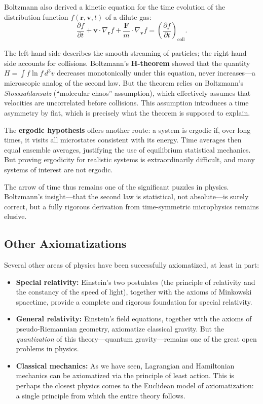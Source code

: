 Boltzmann also derived a kinetic equation for the time evolution of the distribution function $f(\mathbf{r}, \mathbf{v}, t)$ of a dilute gas:
\[
\frac{\partial f}{\partial t} + \mathbf{v} \cdot \nabla_{\mathbf{r}} f + \frac{\mathbf{F}}{m} \cdot \nabla_{\mathbf{v}} f = \left( \frac{\partial f}{\partial t} \right)_{\text{coll}}.
\]

The left-hand side describes the smooth streaming of particles; the right-hand side accounts for collisions. Boltzmann's \textbf{H-theorem} showed that the quantity $H = \int f \ln f \, d^3v$ decreases monotonically under this equation, never increases---a microscopic analog of the second law. But the theorem relies on Boltzmann's \emph{Stosszahlansatz} (``molecular chaos'' assumption), which effectively assumes that velocities are uncorrelated before collisions. This assumption introduces a time asymmetry by fiat, which is precisely what the theorem is supposed to explain.

The \textbf{ergodic hypothesis} offers another route: a system is ergodic if, over long times, it visits all microstates consistent with its energy. Time averages then equal ensemble averages, justifying the use of equilibrium statistical mechanics. But proving ergodicity for realistic systems is extraordinarily difficult, and many systems of interest are not ergodic.

The arrow of time thus remains one of the significant puzzles in physics. Boltzmann's insight---that the second law is statistical, not absolute---is surely correct, but a fully rigorous derivation from time-symmetric microphysics remains elusive.

\subsection{Other Axiomatizations}

Several other areas of physics have been successfully axiomatized, at least in part:

\begin{itemize}
    \item \textbf{Special relativity:} Einstein's two postulates (the principle of relativity and the constancy of the speed of light), together with the axioms of Minkowski spacetime, provide a complete and rigorous foundation for special relativity.

    \item \textbf{General relativity:} Einstein's field equations, together with the axioms of pseudo-Riemannian geometry, axiomatize classical gravity. But the \emph{quantization} of this theory---quantum gravity---remains one of the great open problems in physics.

    \item \textbf{Classical mechanics:} As we have seen, Lagrangian and Hamiltonian mechanics can be axiomatized via the principle of least action. This is perhaps the closest physics comes to the Euclidean model of axiomatization: a single principle from which the entire theory follows.
\end{itemize}

